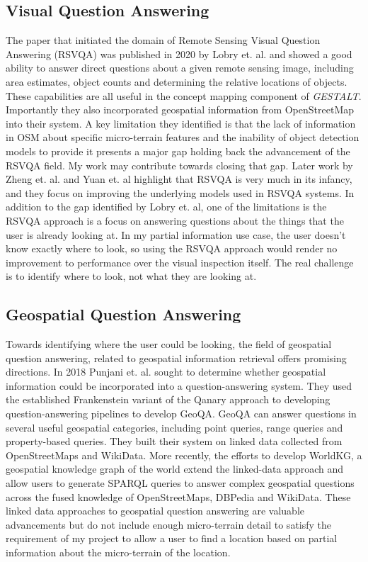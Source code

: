 \subsection{Visual Question Answering}
The paper that initiated the domain of Remote Sensing Visual Question Answering (RSVQA) was published in 2020 by Lobry et. al. and showed a good ability to answer direct questions about a given remote sensing image, including area estimates, object counts and determining the relative locations of objects\cite{Lobry2020}. 
These capabilities are all useful in the concept mapping component of \textit{GESTALT}. Importantly they also incorporated geospatial information from OpenStreetMap into their system. 
A key limitation they identified is that the lack of information in OSM about specific micro-terrain features and the inability of object detection models to provide it presents a major gap holding back the advancement of the RSVQA field. 
My work may contribute towards closing that gap. Later work by Zheng et. al. and Yuan et. al highlight that RSVQA is very much in its infancy, and they focus on improving the underlying models used in RSVQA systems\cite{Zheng2021, Yuan2022}.
In addition to the gap identified by Lobry et. al, one of the limitations is the RSVQA approach is a focus on answering questions about the things that the user is already looking at. 
In my partial information use case, the user doesn’t know exactly where to look, so using the RSVQA approach would render no improvement to performance over the visual inspection itself. 
The real challenge is to identify where to look, not what they are looking at.

\subsection{Geospatial Question Answering}
 
Towards identifying where the user could be looking, the field of geospatial question answering, related to geospatial information retrieval offers promising directions. 
In 2018 Punjani et. al. sought to determine whether geospatial information could be incorporated into a question-answering system\cite{Punjani2018}. 
They used the established Frankenstein variant of the Qanary approach to developing question-answering pipelines to develop GeoQA. 
GeoQA can answer questions in several useful geospatial categories, including point queries, range queries and property-based queries. 
They built their system on linked data collected from OpenStreetMaps and WikiData. 
More recently, the efforts to develop WorldKG, a geospatial knowledge graph of the world extend the linked-data approach and allow users to generate SPARQL queries to answer complex geospatial questions across the fused knowledge of OpenStreetMaps, DBPedia and WikiData\cite{dsouza2021}. 
These linked data approaches to geospatial question answering are valuable advancements but do not include enough micro-terrain detail to satisfy the requirement of my project to allow a user to find a location based on partial information about the micro-terrain of the location.


